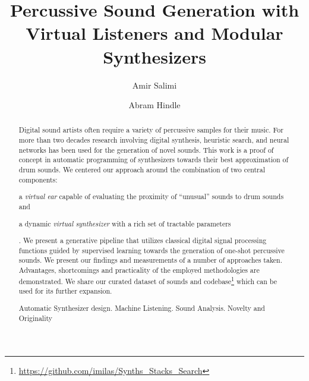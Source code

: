 \documentclass[runningheads,a4paper]{llncs}
\newcommand{\keywords}[1]{\par\addvspace\baselineskip
\noindent\keywordname\enspace\ignorespaces#1}
\begin{document}
\mainmatter  

\title{Percussive Sound Generation with Virtual Listeners and Modular Synthesizers}


\author{Amir Salimi \and Abram Hindle}



\maketitle

\begin{abstract}
Digital sound artists often require a variety of percussive samples for their music. For more than two decades research involving digital synthesis, heuristic search, and neural networks has been used for the generation of novel sounds. This work is a proof of concept in automatic programming of synthesizers towards their best approximation of drum sounds. We centered our approach around the combination of two central components: \begin {enumerate*} [label=(\roman*)] \item a \emph{virtual ear} capable of evaluating the proximity of \enquote{unusual} sounds to drum sounds and \item a dynamic \emph{virtual synthesizer} with a rich set of tractable parameters\end{enumerate*}. We present a generative pipeline that utilizes classical digital signal processing functions guided by supervised learning towards the generation of one-shot percussive sounds. We present our findings and measurements of a number of approaches taken. Advantages, shortcomings and practicality of the employed methodologies are demonstrated. We share our curated dataset of sounds and codebase\footnote{\url{https://github.com/imilas/Synths_Stacks_Search}} which can be used for its further expansion.
\keywords{Automatic Synthesizer design. Machine Listening. Sound Analysis. Novelty and Originality}
\end{abstract}
\end{document}
